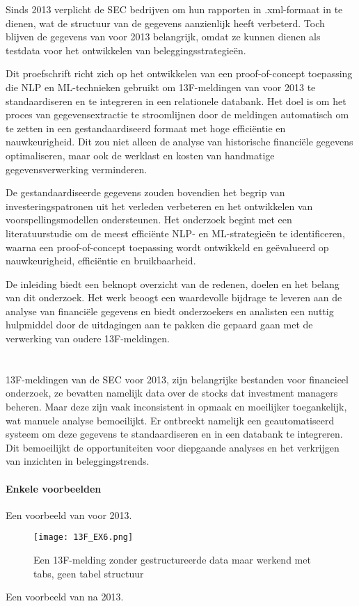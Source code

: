 Sinds 2013 verplicht de SEC bedrijven om hun rapporten in .xml-formaat in te dienen, wat de structuur van de gegevens aanzienlijk heeft verbeterd. Toch blijven de gegevens van voor 2013 belangrijk, omdat ze kunnen dienen als testdata voor het ontwikkelen van beleggingsstrategieën.

Dit proefschrift richt zich op het ontwikkelen van een proof-of-concept toepassing die NLP en ML-technieken gebruikt om 13F-meldingen van voor 2013 te standaardiseren en te integreren in een relationele databank. Het doel is om het proces van gegevensextractie te stroomlijnen door de meldingen automatisch om te zetten in een gestandaardiseerd formaat met hoge efficiëntie en nauwkeurigheid. Dit zou niet alleen de analyse van historische financiële gegevens optimaliseren, maar ook de werklast en kosten van handmatige gegevensverwerking verminderen.

De gestandaardiseerde gegevens zouden bovendien het begrip van investeringspatronen uit het verleden verbeteren en het ontwikkelen van voorspellingsmodellen ondersteunen. Het onderzoek begint met een literatuurstudie om de meest efficiënte NLP- en ML-strategieën te identificeren, waarna een proof-of-concept toepassing wordt ontwikkeld en geëvalueerd op nauwkeurigheid, efficiëntie en bruikbaarheid.

De inleiding biedt een beknopt overzicht van de redenen, doelen en het belang van dit onderzoek. Het werk beoogt een waardevolle bijdrage te leveren aan de analyse van financiële gegevens en biedt onderzoekers en analisten een nuttig hulpmiddel door de uitdagingen aan te pakken die gepaard gaan met de verwerking van oudere 13F-meldingen.

\section{}%
\label{sec:probleemstelling}

13F-meldingen van de SEC voor 2013, zijn belangrijke bestanden voor financieel onderzoek, ze bevatten namelijk data over de stocks dat investment managers beheren. Maar deze zijn vaak inconsistent in opmaak en moeilijker toegankelijk, wat manuele analyse bemoeilijkt. Er ontbreekt namelijk een geautomatiseerd systeem om deze gegevens te standaardiseren en in een databank te integreren. Dit bemoeilijkt de opportuniteiten voor diepgaande analyses en het verkrijgen van inzichten in beleggingstrends.

\paragraph{Enkele voorbeelden}
Een voorbeeld van voor 2013.
\begin{figure}[hbt!]
    \texttt{[image: 13F\_EX6.png]}
    \caption[13F voorbeeld 7]{\label{fig:voorbeeld voor 2013 - inleiding}Een 13F-melding zonder gestructureerde data maar werkend met tabs, geen tabel structuur}
\end{figure}
Een voorbeeld van na 2013.


